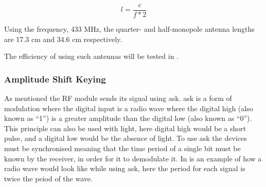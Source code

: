 \begin{equation}
l = \frac{c}{f * 2}
\end{equation}

Using the frequency, 433 MHz, the quarter- and half-monopole antenna lengths are 17.3 cm and 34.6 cm respectively.
\cite{AntennaLength}

The efficiency of using such antennas will be tested in .

\subsubsection{Amplitude Shift Keying}\label{subsub:ask}
As mentioned the RF module sends its signal using \gls{ask}.
\gls{ask} is a form of modulation where the digital input is a radio wave where the digital high (also known as ``1'') is a greater amplitude than the digital low (also known as ``0'').
This principle can also be used with light, here digital high would be a short pulse, and a digital low would be the absence of light. 
To use \gls{ask} the devices must be synchronised meaning that the time period of a single bit must be known by the receiver, in order for it to demodulate it. 
In  is an example of how a radio wave would look like while using \gls{ask}, here the period for each signal is twice the peiod of the wave. \cite{ASKnFSK}

